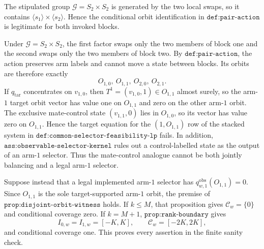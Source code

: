 The stipulated group \(\mathcal G=S_2\times S_2\) is generated by the two local swaps, so it contains \(\langle s_1\rangle\times\langle s_2\rangle\). Hence the conditional orbit identification in \(\texttt{def:pair-action}\) is legitimate for both invoked blocks.

Under \(\mathcal G=S_2\times S_2\), the first factor swaps only the two members of block one and the second swaps only the two members of block two. By \(\texttt{def:pair-action}\), the action preserves arm labels and cannot move a state between blocks. Its orbits are therefore exactly
\[O_{1,0},\ O_{1,1},\ O_{2,0},\ O_{2,1}.\]
If \(q_{\mathrm{tar}}\) concentrates on \(v_{1,0}\), then \(T^1=(v_{1,0},1)\in O_{1,1}\) almost surely, so the arm-\(1\) target orbit vector has value one on \(O_{1,1}\) and zero on the other arm-\(1\) orbit. The exclusive mate-control state \((v_{1,1},0)\) lies in \(O_{1,0}\), so its vector has value zero on \(O_{1,1}\). Hence the target equation for the \((1,O_{1,1})\) row of the stacked system in \(\texttt{def:common-selector-feasibility-lp}\) fails. In addition, \(\texttt{ass:observable-selector-kernel}\) rules out a control-labelled state as the output of an arm-\(1\) selector. Thus the mate-control analogue cannot be both jointly balancing and a legal arm-\(1\) selector.

Suppose instead that a legal implemented arm-\(1\) selector has \(q^{\mathrm{obs}}_{w,1}(O_{1,1})=0\). Since \(O_{1,1}\) is the sole target-supported arm-\(1\) orbit, the premise of \(\texttt{prop:disjoint-orbit-witness}\) holds. If \(k\le M\), that proposition gives \(\mathcal C_w=\{0\}\) and conditional coverage zero. If \(k=M+1\), \(\texttt{prop:rank-boundary}\) gives
\[I_{0,w}=I_{1,w}=[-K,K],\qquad \mathcal C_w=[-2K,2K],\]
and conditional coverage one. This proves every assertion in the finite sanity check.